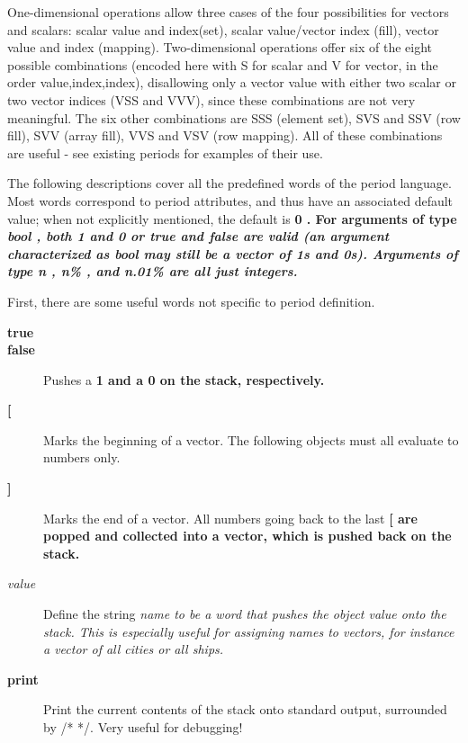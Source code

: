 \par\noindent
One-dimensional operations allow three cases of the four possibilities for
vectors and scalars: scalar value and index(set), 
scalar value/vector index (fill), vector value and index (mapping).
Two-dimensional operations offer six of the eight possible combinations
(encoded here with S for scalar and V for vector,
in the order value,index,index),
disallowing only a vector value with either two scalar or two vector
indices (VSS and VVV), since these combinations are not very meaningful.
The six other combinations are SSS (element set), SVS and SSV (row fill),
SVV (array fill), VVS and VSV (row mapping).  All of these combinations
are useful - see existing periods for examples of their use.
\par\noindent
The following descriptions cover all the predefined words of the period
language.  Most words correspond to period attributes, and
thus have an associated default value; when not explicitly mentioned, the
default is %
\bf 0\rm%
.
For arguments of type %
\it bool\rm%
, both %
\bf 1 \rm%
and %
\bf 0 \rm%
or %
\bf true \rm%
and %
\bf false \rm%
are valid (an argument characterized as %
\it bool \rm%
may
still be a vector of 1s and 0s).  Arguments of type %
\it n\rm%
, %
\it n\%\rm%
,
and %
\it n.01\% \rm%
are all just integers.
\par\noindent
First, there are some useful words not specific to period
definition.
\begin{description}
\item[{%
\bf true%
\rm }]
\item[{%
\bf false%
\rm }]
Pushes a %
\bf 1 \rm%
and a %
\bf 0 \rm%
on the stack, respectively.
\item[{%
\bf [%
\rm }]
Marks the beginning of a vector.  The following objects must all evaluate
to numbers only.
\item[{%
\bf ]%
\rm }]
Marks the end of a vector.  All numbers going back to the last %
\bf [ \rm%
are popped and collected into a vector, which is pushed back on the stack.
\item[{%
\it value}]
Define the string %
\it name \rm%
to be a word
that pushes the object %
\it value \rm%
onto the
stack.  This is especially useful for assigning names to vectors, for
instance a vector of all cities or all ships.
\item[{%
\bf print\rm%
}]
Print the current contents of the stack onto standard output, surrounded
by /* */.  Very useful for debugging!
\end{description}\par\noindent
